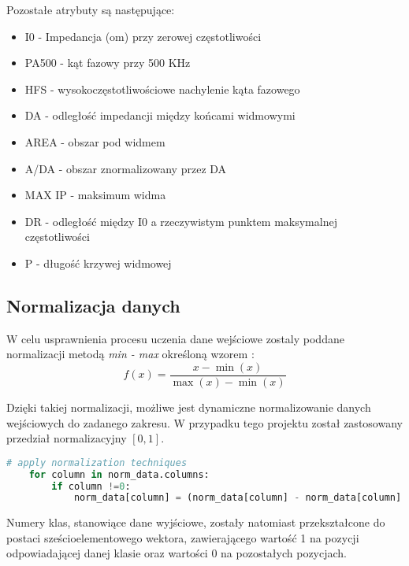 \documentclass[12pt,twoside]{article}
\begin{document}
Pozostałe atrybuty są następujące:
\begin{itemize}
\item I0 - Impedancja (om) przy zerowej częstotliwości
\item PA500 - kąt fazowy przy 500 KHz
\item HFS - wysokoczęstotliwościowe nachylenie kąta fazowego
\item DA - odległość impedancji między końcami widmowymi
\item AREA - obszar pod widmem
\item A/DA - obszar znormalizowany przez DA
\item MAX IP - maksimum widma
\item DR - odległość między I0 a rzeczywistym punktem maksymalnej częstotliwości
\item P - długość krzywej widmowej\\
\end{itemize}
\clearpage

\subsection{Normalizacja danych}
W celu usprawnienia procesu uczenia dane wejściowe zostaly poddane normalizacji metodą \textit{min - max} określoną wzorem \cite{norm}:
\begin{equation}
f(x) = \frac{x - \min{(x)}}{\max{(x)} - \min{(x)}}
\end{equation}


Dzięki takiej normalizacji, możliwe jest dynamiczne normalizowanie danych wejściowych do zadanego zakresu. W przypadku tego projektu został zastosowany przedział normalizacyjny $ [0, 1]$.\\

\begin{lstlisting}[language=Python,caption=Algorytm normalizacji,label={Kod1}]
    # apply normalization techniques
    for column in norm_data.columns:
        if column !=0:
            norm_data[column] = (norm_data[column] - norm_data[column].min()) / (norm_data[column].max() - norm_data[column].min())

\end{lstlisting}

Numery klas, stanowiące dane wyjściowe, zostały natomiast przekształcone do postaci sześcioelementowego wektora, zawierającego wartość 1 na pozycji odpowiadającej danej klasie oraz wartości 0 na pozostałych pozycjach.
\end{document}
